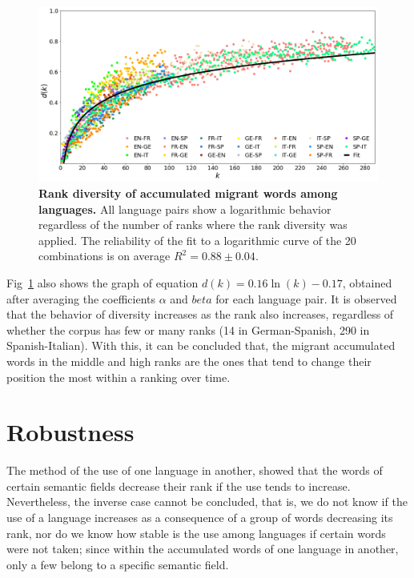 \documentclass[10pt,letterpaper]{article} %
\begin{document}
\begin{figure}[!h]
	\begin{adjustwidth}{-2.5cm}{1cm}
		\centering
		\includegraphics[scale=.38]{DR_art.png}
		\caption{{\bf Rank diversity of accumulated migrant words among languages.} All language pairs show a logarithmic behavior regardless of the number of ranks where the rank diversity was applied. The reliability of the fit to a logarithmic curve of the 20 combinations is on average $R^{2}= 0.88 \pm 0.04$.}
		\label{fig.DR_art}
	\end{adjustwidth}
\end{figure}


Fig~\ref{fig.DR_art} also shows the graph of equation $d(k) = 0.16\ln(k) - 0.17$, obtained after averaging the coefficients $\alpha$ and $beta$ for each language pair. It is observed that the behavior of diversity increases as the rank also increases, regardless of whether the corpus has few or many ranks (14 in German-Spanish, 290 in Spanish-Italian). With this, it can be concluded that, the migrant accumulated words in the middle and high ranks are the ones that tend to change their position the most within a ranking over time.



\section*{Robustness} %

The method of the use of one language in another, showed that the words of certain semantic fields decrease their rank if the use tends to increase. Nevertheless, the inverse case cannot be concluded, that is, we do not know if the use of a language increases as a consequence of a group of words decreasing its rank, nor do we know how stable is the use among languages ​​if certain words were not taken; since within the accumulated words of one language in another, only a few belong to a specific semantic field.
\end{document}
